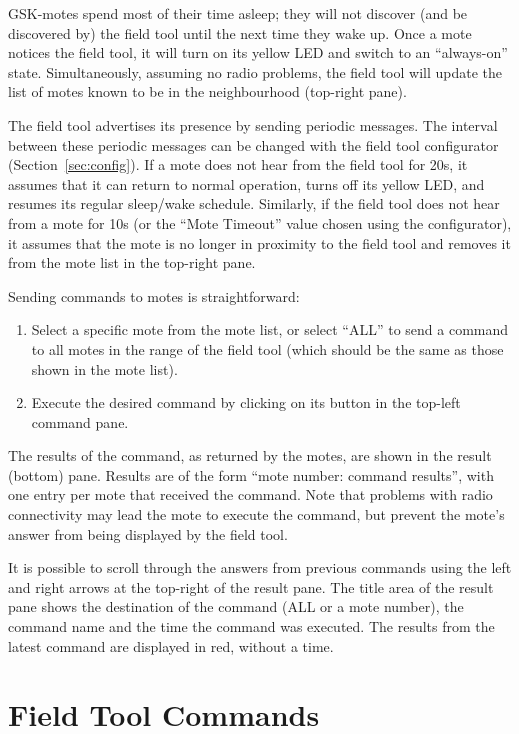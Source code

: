 \documentclass{article}
\begin{document}
GSK-motes spend most of their time asleep; they will not discover (and be
discovered by) the field tool until the next time they wake up. Once a mote
notices the field tool, it will turn on its yellow LED and switch to an
``always-on'' state. Simultaneously, assuming no radio problems, the field
tool will update the list of motes known to be in the neighbourhood
(top-right pane). 

The field tool advertises its presence by sending periodic messages. The
interval between these periodic messages can be changed with the field tool
configurator (Section~\ref{sec:config}). If a mote does not hear from the
field tool for 20s, it assumes that it can return to normal operation,
turns off its yellow LED, and resumes its regular sleep/wake
schedule. Similarly, if the field tool does not hear from a mote for 10s
(or the ``Mote Timeout'' value chosen using the configurator), it assumes
that the mote is no longer in proximity to the field tool and removes it
from the mote list in the top-right pane.

Sending commands to motes is straightforward:
\begin{enumerate}
\item Select a specific mote from the mote list, or select ``ALL'' to send
a command to all motes in the range of the field tool (which should be 
the same as those shown in the mote list).
\item Execute the desired command by clicking on its button in the top-left
command pane.
\end{enumerate}
The results of the command, as returned by the motes, are shown in the
result (bottom) pane. Results are of the form ``mote number: command
results'', with one entry per mote that received the command. Note that
problems with radio connectivity may lead the mote to execute the command,
but prevent the mote's answer from being displayed by the field tool.

It is possible to scroll through the answers from previous commands using
the left and right arrows at the top-right of the result pane. The title
area of the result pane shows the destination of the command (ALL or a mote
number), the command name and the time the command was executed. The
results from the latest command are displayed in red, without a time.

\section{Field Tool Commands}
\end{document}
